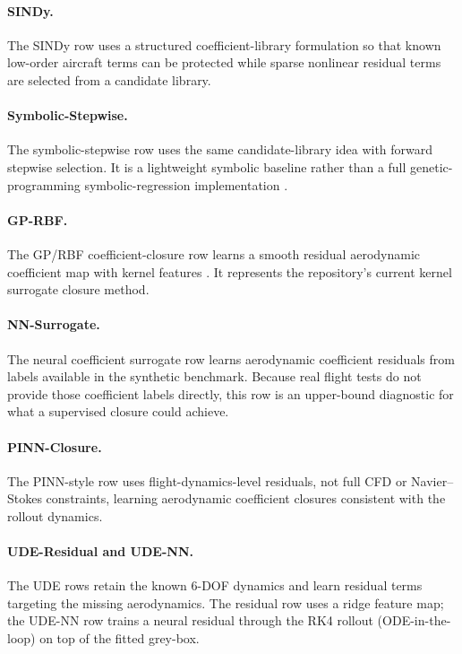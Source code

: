 \documentclass[11pt]{article}
\begin{document}
\paragraph{SINDy.}
The SINDy row \cite{brunton2016discovering,champion2019data} uses a structured coefficient-library formulation so that known low-order aircraft terms can be protected while sparse nonlinear residual terms are selected from a candidate library.

\paragraph{Symbolic-Stepwise.}
The symbolic-stepwise row uses the same candidate-library idea with forward stepwise selection. It is a lightweight symbolic baseline rather than a full genetic-programming symbolic-regression implementation \cite{koza1990genetic,makke_interpretable_2024}.

\paragraph{GP-RBF.}
The GP/RBF coefficient-closure row learns a smooth residual aerodynamic coefficient map with kernel features \cite{rasmussen2006gaussian,hemakumara2013learning}. It represents the repository's current kernel surrogate closure method.

\paragraph{NN-Surrogate.}
The neural coefficient surrogate row learns aerodynamic coefficient residuals from labels available in the synthetic benchmark. Because real flight tests do not provide those coefficient labels directly, this row is an upper-bound diagnostic for what a supervised closure could achieve.

\paragraph{PINN-Closure.}
The PINN-style row \cite{raissi2017physics,lagaris1998artificial} uses flight-dynamics-level residuals, not full CFD or Navier--Stokes constraints, learning aerodynamic coefficient closures consistent with the rollout dynamics.

\paragraph{UDE-Residual and UDE-NN.}
The UDE rows \cite{rackauckas2020universal} retain the known 6-DOF dynamics and learn residual terms targeting the missing aerodynamics. The residual row uses a ridge feature map; the UDE-NN row trains a neural residual through the RK4 rollout (ODE-in-the-loop) on top of the fitted grey-box.
\end{document}
